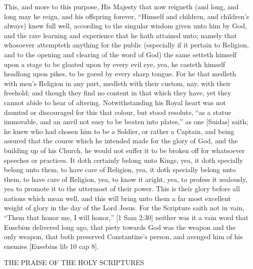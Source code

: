{\par }{\IP This, and more to this purpose, His Majesty that now reigneth (and long, and long may he reign, and his offspring forever, “Himself and children, and children’s always) knew full well, according to the singular wisdom given unto him by God, and the rare learning and experience that he hath attained unto; namely that whosoever attempteth anything for the public (especially if it pertain to Religion, and to the opening and clearing of the word of God) the same setteth himself upon a stage to be gloated upon by every evil eye, yea, he casteth himself headlong upon pikes, to be gored by every sharp tongue. For he that medleth with men’s Religion in any part, medleth with their custom, nay, with their freehold; and though they find no content in that which they have, yet they cannot abide to hear of altering. Notwithstanding his Royal heart was not daunted or discouraged for this that colour, but stood resolute, “as a statue immovable, and an anvil not easy to be beaten into plates,” as one [Suidas] saith; he knew who had chosen him to be a Soldier, or rather a Captain, and being assured that the course which he intended made for the glory of God, and the building up of his Church, he would not suffer it to be broken off for whatsoever speeches or practices. It doth certainly belong unto Kings, yea, it doth specially belong unto them, to have care of Religion, yea, it doth specially belong unto them, to have care of Religion, yea, to know it aright, yea, to profess it zealously, yea to promote it to the uttermost of their power. This is their glory before all nations which mean well, and this will bring unto them a far most excellent weight of glory in the day of the Lord Jesus. For the Scripture saith not in vain, “Them that honor me, I will honor,” [1 Sam 2:30] neither was it a vain word that Eusebius delivered long ago, that piety towards God was the weapon and the only weapon, that both preserved Constantine’s person, and avenged him of his enemies [Eusebius lib 10 cap 8].
\par }{\IS THE PRAISE OF THE HOLY SCRIPTURES
}
